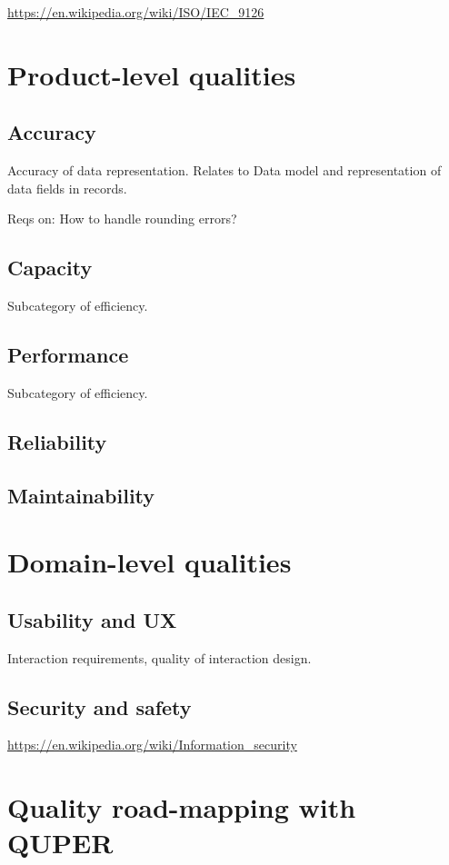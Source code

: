 \documentclass{reqengbook}
\begin{document}
\url{https://en.wikipedia.org/wiki/ISO/IEC_9126}

\section{Product-level qualities}
\subsection{Accuracy}

Accuracy of data representation. Relates to Data model and  representation of data fields in records.

Reqs on: How to handle rounding errors?

\subsection{Capacity}
Subcategory of efficiency.

\subsection{Performance}
Subcategory of efficiency.

\subsection{Reliability}

\subsection{Maintainability}

\section{Domain-level qualities}

\subsection{Usability and UX}

Interaction requirements, quality of interaction design.

\subsection{Security and safety}

\url{https://en.wikipedia.org/wiki/Information_security}

\section{Quality road-mapping with QUPER}
\end{document}
